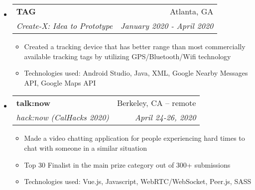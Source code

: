 \documentclass[letterpaper,10pt]{article}
\makeatletter
\newcommand{\resitem}[1]{\item #1 \vspace{-2pt}}
\newcommand{\ressubheading}[4]{
\begin{tabular*}{7.0in}{l@{\extracolsep{\fill}}r}
		\textbf{#1} & #2 \\
		\textit{#3} & \textit{#4} \\
\end{tabular*}\vspace{-6pt}}
\makeatother
\begin{document}
\begin{itemize}
\item
    \ressubheading{TAG}{Atlanta, GA}{Create-X: Idea to Prototype}{January 2020 - April 2020}
    \begin{itemize}
        \resitem{Created a tracking device that has better range than most commercially available tracking tags by utilizing GPS/Bluetooth/Wifi technology}
        \resitem{Technologies used: Android Studio, Java, XML, Google Nearby Messages API, Google Maps API}
    \end{itemize}
\item
    \ressubheading{talk:now}{Berkeley, CA -- remote}{hack:now (CalHacks 2020)}{April 24-26, 2020}
    \begin{itemize}
        \resitem{Made a video chatting application for people experiencing hard times to chat with someone in a similar situation}
        \resitem{Top 30 Finalist in the main prize category out of 300+ submissions}
        \resitem{Technologies used: Vue.js, Javascript, WebRTC/WebSocket, Peer.js, SASS}
    \end{itemize}

\end{itemize}
\end{document}
